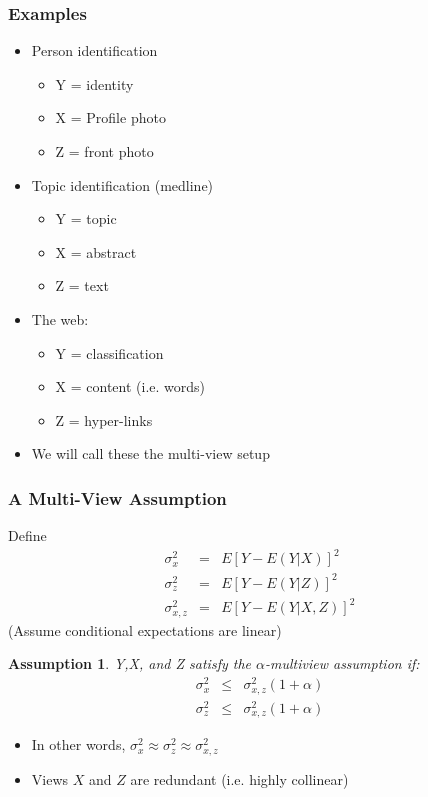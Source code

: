 \documentclass{beamer}
\newtheorem{assumption}{Assumption}
\begin{document}
\begin{frame}
  \frametitle{Examples}

\begin{itemize}
\item Person identification
\begin{itemize}
\item Y = identity
\item X = Profile photo
\item Z = front photo
\end{itemize}
\item Topic identification (medline)
\begin{itemize}
\item Y = topic
\item X = abstract
\item Z = text
\end{itemize}
\item The web:
\begin{itemize}
\item Y = classification
\item X = content (i.e. words)
\item Z = hyper-links
\end{itemize}
\item We will call these the multi-view setup
\end{itemize}
\end{frame}


\begin{frame}
  \frametitle{A Multi-View Assumption}
Define
\begin{eqnarray*}
\sigma_x^2 &=& E[Y - E(Y|X)]^2\\
\sigma_z^2 &=& E[Y - E(Y|Z)]^2\\
\sigma_{x,z}^2 &=& E[Y - E(Y|X,Z)]^2
\end{eqnarray*}
(Assume conditional expectations are linear)
\begin{assumption} Y,X, and Z
satisfy the $\alpha$-multiview assumption if:
\begin{eqnarray*}
\sigma_x^2 &\le& \sigma_{x,z}^2(1 + \alpha)\\
\sigma_z^2 &\le& \sigma_{x,z}^2(1 + \alpha)
\end{eqnarray*}
\end{assumption}
\begin{itemize}
\item In other words, $\sigma_x^2 \approx \sigma_z^2 \approx \sigma_{x,z}^2$
\item Views $X$ and $Z$ are redundant (i.e. highly collinear)
\end{itemize}
\end{frame}
\end{document}
